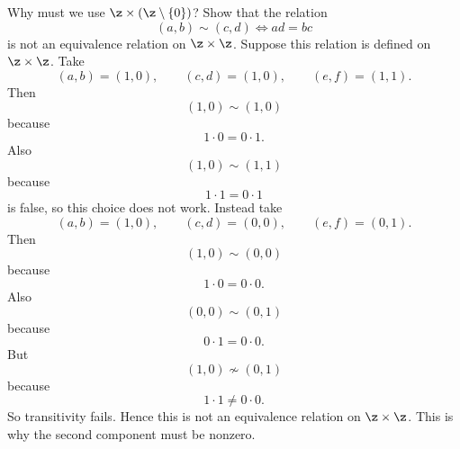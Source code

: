 \begin{problem}{
    Why must we use $\z\times(\z\setminus\{0\})$?
    Show that the relation
    \[
        (a,b)\sim(c,d)\iff ad=bc
    \]
    is not an equivalence relation on $\z\times\z$.
}
    Suppose this relation is defined on $\z\times\z$.
    Take
    \[
        (a,b)=(1,0),\qquad (c,d)=(1,0),\qquad (e,f)=(1,1).
    \]
    Then
    \[
        (1,0)\sim(1,0)
    \]
    because
    \[
        1\cdot 0=0\cdot 1.
    \]
    Also
    \[
        (1,0)\sim(1,1)
    \]
    because
    \[
        1\cdot 1=0\cdot 1
    \]
    is false, so this choice does not work.
    Instead take
    \[
        (a,b)=(1,0),\qquad (c,d)=(0,0),\qquad (e,f)=(0,1).
    \]
    Then
    \[
        (1,0)\sim(0,0)
    \]
    because
    \[
        1\cdot 0=0\cdot 0.
    \]
    Also
    \[
        (0,0)\sim(0,1)
    \]
    because
    \[
        0\cdot 1=0\cdot 0.
    \]
    But
    \[
        (1,0)\not\sim(0,1)
    \]
    because
    \[
        1\cdot 1\neq 0\cdot 0.
    \]
    So transitivity fails.
    Hence this is not an equivalence relation on $\z\times\z$.
    This is why the second component must be nonzero.
\end{problem}